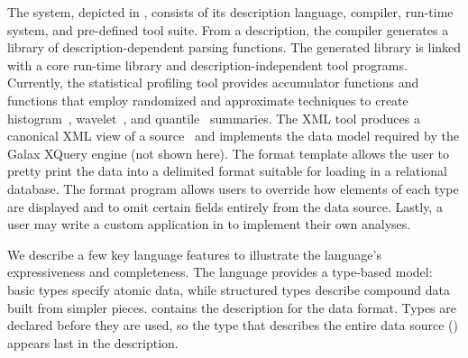 The \pads{} system, depicted in , consists of its
description language, compiler, run-time system, and pre-defined tool
suite.  From a description, the compiler generates a library of
description-dependent parsing functions.  The generated library is
linked with a core run-time library and description-independent tool
programs.  Currently, the statistical profiling tool provides
accumulator functions and functions that employ randomized and
approximate techniques to create histogram~\cite{histograms},
wavelet~\cite{histograms-wavelets}, and quantile~\cite{quantiles}
summaries.  The XML tool produces a canonical XML view
of a \pads{} source~\cite{fernandez+:padx} and implements the data
model required by the Galax XQuery engine (not shown here).
The format template allows the user to pretty print the data into a  
delimited format suitable for loading in a relational database.   
  The format program allows users to override how  
elements of each type are displayed and to omit certain fields  
entirely from the data source.
Lastly, a user may write a custom
application in \C{} to implement their own analyses.

We describe a few key language features to illustrate the language's
expressiveness and completeness.  The language provides a type-based
model: basic types specify atomic data, while structured types
describe compound data built from simpler pieces.
 contains the \pads{} description for the
\dibbler{} data format.  Types are declared
before they are used, so the type that describes the entire data
source () appears last in the description.

